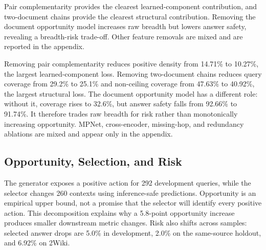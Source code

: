 \documentclass[10pt,twocolumn]{article}
\begin{document}
\begin{table}[t]
\centering
\small
\caption{Core generator ablations on fully nested development actions}
\label{tab:3}
\end{table}

Pair complementarity provides the clearest learned-component contribution, and two-document chains provide the clearest structural contribution. Removing the document opportunity model increases raw breadth but lowers answer safety, revealing a breadth-risk trade-off. Other feature removals are mixed and are reported in the appendix.

Removing pair complementarity reduces positive density from 14.71\% to 10.27\%, the largest learned-component loss. Removing two-document chains reduces query coverage from 29.2\% to 25.1\% and non-ceiling coverage from 47.63\% to 40.92\%, the largest structural loss. The document opportunity model has a different role: without it, coverage rises to 32.6\%, but answer safety falls from 92.66\% to 91.74\%. It therefore trades raw breadth for risk rather than monotonically increasing opportunity. MPNet, cross-encoder, missing-hop, and redundancy ablations are mixed and appear only in the appendix.

\subsection{Opportunity, Selection, and Risk}

The generator exposes a positive action for 292 development queries, while the selector changes 260 contexts using inference-safe predictions. Opportunity is an empirical upper bound, not a promise that the selector will identify every positive action. This decomposition explains why a 5.8-point opportunity increase produces smaller downstream metric changes. Risk also shifts across samples: selected answer drops are 5.0\% in development, 2.0\% on the same-source holdout, and 6.92\% on 2Wiki.
\end{document}
